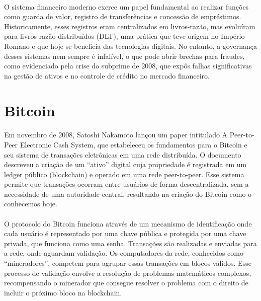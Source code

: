 \documentclass[letterpaper,11pt,leqno]{article}
\newcommand{\quotes}[1]{``#1''}
\begin{document}
\paragraph{}
O sistema financeiro moderno exerce um papel fundamental ao realizar funções
como guarda de valor, registro de transferências e concessão de empréstimos.
Historicamente, esses registros eram centralizados em livros-razão, mas
evoluíram para livros-razão distribuídos (DLT), uma prática que teve origem no
Império Romano e que hoje se beneficia das tecnologias digitais. No entanto, a
governança desses sistemas nem sempre é infalível, o que pode abrir brechas para
fraudes, como evidenciado pela crise do subprime de 2008, que expôs falhas
significativas na gestão de ativos e no controle de crédito no mercado
financeiro.

\section{Bitcoin}

\paragraph{}
Em novembro de 2008, Satoshi Nakamoto lançou um paper intitulado A Peer-to-Peer
Electronic Cash System, que estabeleceu os fundamentos para o Bitcoin e seu
sistema de transações eletrônicas em uma rede distribuída. O documento descreveu
a criação de um \quotes{ativo} digital cuja propriedade é registrada em um
ledger público (blockchain) e operado em uma rede peer-to-peer. Esse sistema
permite que transações ocorram entre usuários de forma descentralizada, sem a
necessidade de uma autoridade central, resultando na criação do Bitcoin como o
conhecemos hoje.

\paragraph{}
O protocolo do Bitcoin funciona através de um mecanismo de identificação onde
cada usuário é representado por uma chave pública e protegida por uma chave
privada, que funciona como uma senha. Transações são realizadas e enviadas para
a rede, onde aguardam validação. Os computadores da rede, conhecidos como
\quotes{mineradores}, competem para agrupar essas transações em blocos válidos.
Esse processo de validação envolve a resolução de problemas matemáticos
complexos, recompensando o minerador que consegue resolver o problema com o
direito de incluir o próximo bloco na blockchain.
\end{document}

